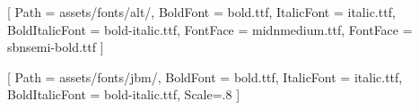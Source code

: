 \newfontfamily{}[
    Path = assets/fonts/alt/,
    BoldFont = bold.ttf,
    ItalicFont = italic.ttf,
    BoldItalicFont = bold-italic.ttf,
    FontFace = {mid}{n}{medium.ttf},
    FontFace = {sb}{n}{semi-bold.ttf}
]

\newfontfamily{}[
    Path = assets/fonts/jbm/,
    BoldFont = bold.ttf,
    ItalicFont = italic.ttf,
    BoldItalicFont = bold-italic.ttf,
    Scale=.8
]

